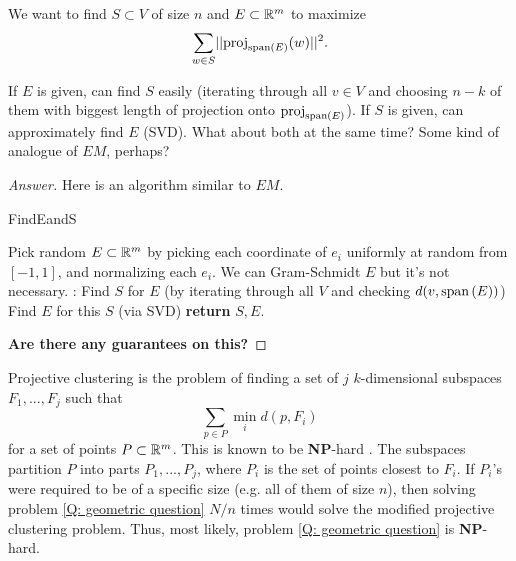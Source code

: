\documentclass{article}
\begin{document}
\begin{question}
We want to find $S\subset V$ of size $n$ and $E\subset \mathbb{R}^m$ to maximize $$\sum_{w\in S}\norm{\proj_{\vspan{E}}(w)}^2.$$
    
If $E$ is given, can find $S$ easily (iterating through all $v\in V$ and choosing $n-k$ of them with biggest length of projection onto $\text{proj}_{\text{span}\left(E\right)}$). If $S$ is given, can approximately find $E$ (SVD). What about both at the same time? Some kind of analogue of $EM$, perhaps?
\end{question}

\begin{proof}[Answer]
Here is an algorithm similar to $EM$.
\begin{algorithm}[H]
\caption{FindEandS}
\label{alg: EM-like alg}
    \begin{algorithmic}[1]
    \State Pick random $E\subset \mathbb{R}^m$ by picking each coordinate of $e_i$ uniformly at random from $[-1,1]$, and normalizing each $e_i$. We can Gram-Schmidt $E$ but it's not necessary.
    :
        \State Find $S$ for $E$ (by iterating through all $V$ and checking $d(v,\text{span}\left(E\right))$)
        \State Find $E$ for this $S$ (via SVD)
    \EndWhile
    \textbf{return} $S,E$.
    \end{algorithmic}
\end{algorithm}
\textbf{Are there any guarantees on this?}
\end{proof}

\begin{question}
    Projective clustering is the problem of finding a set of $j$ $k$-dimensional subspaces $F_1,...,F_j$ such that $$\sum_{p\in P}\min_i d(p,F_i)$$
    for a set of points $P\subset \mathbb{R}^m$. This is known to be \textbf{NP}-hard \cite{deshpande2006matrix}. The subspaces partition $P$ into parts $P_1,...,P_j$, where $P_i$ is the set of points closest to $F_i$. If $P_i$'s were required to be of a specific size (e.g. all of them of size $n$), then solving problem \ref{Q: geometric question} $N/n$ times would solve the modified projective clustering problem. Thus, most likely, problem \ref{Q: geometric question} is \textbf{NP}-hard.
\end{question}
\end{document}
